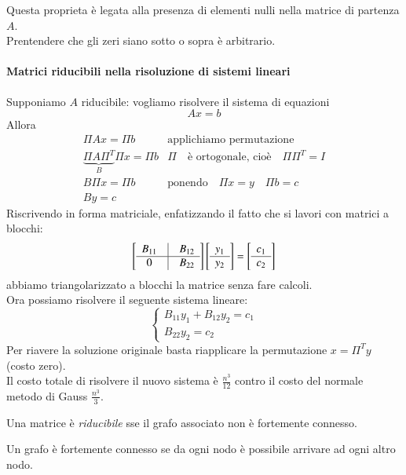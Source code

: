Questa proprieta \`e legata alla presenza di elementi nulli nella matrice di
 partenza $A$.\\
Prentendere che gli zeri siano sotto o sopra \`e arbitrario.\\

\paragraph{Matrici riducibili nella risoluzione di sistemi lineari}
Supponiamo $A$ riducibile: vogliamo risolvere il sistema di equazioni
$$Ax = b$$
Allora  
$$
\begin{array}{ll}
\Pi A x = \Pi b & \text{applichiamo permutazione} \\
\underbrace{\Pi A \Pi^{T}}_{B} \Pi x = \Pi b & 
\Pi \quad \text{\`e ortogonale, cio\`e} \quad \Pi \Pi ^{T} = I \\
B \Pi x = \Pi b & \text{ponendo} \quad \Pi x = y \quad \Pi b = c \\
B y = c
\end{array}
$$
Riscrivendo in forma matriciale, enfatizzando il fatto che si lavori
con matrici a blocchi:
$$
\left[
  \begin{array}{ccc}
    B_{11} & \vline & B_{12} \\
    \hline                    
    0      & \vline & B_{22}   
  \end{array}
\right]
\left[
  \begin{array}{c}
    y_1  \\
    \hline
    y_2 
  \end{array}
\right]
=
\left[
  \begin{array}{c}
    c_1  \\
    \hline
    c_2 
  \end{array}
\right]
$$
abbiamo triangolarizzato a blocchi la matrice senza fare calcoli.\\
Ora possiamo risolvere il seguente sistema lineare:
$$
\left\{
  \begin{array}{ll}
    B_{11}y_1 + B_{12}y_2 = c_1 \\
    B_{22}y_{2} = c_2           
  \end{array}
\right.
$$
Per riavere la soluzione originale basta riapplicare la permutazione
$x = \Pi^T y$ (costo zero).\\
Il costo totale di risolvere il nuovo sistema \`e $\frac{n^3}{12}$
contro il costo del normale metodo di Gauss $\frac{n^3}{3}$.

\begin{theo}
Una matrice \`e \emph{riducibile} sse il grafo associato non \`e fortemente
 connesso.
\end{theo}
Un grafo \`e fortemente connesso se da ogni nodo \`e possibile arrivare
 ad ogni altro nodo.
 
